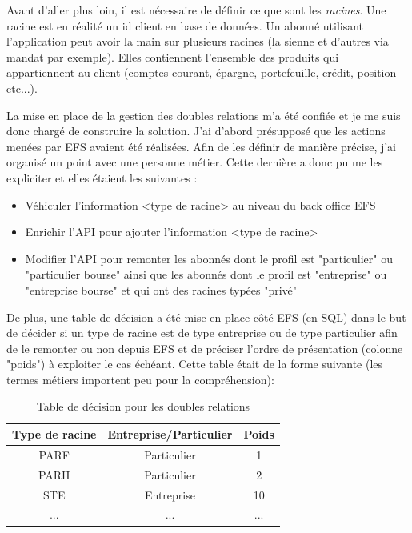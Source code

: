 	Avant d'aller plus loin, il est nécessaire de définir ce que sont les \textit{racines}. Une racine est en réalité un id client en base de données. Un abonné utilisant l'application peut avoir la main sur plusieurs racines (la sienne et d'autres via mandat par exemple). Elles contiennent l'ensemble des produits qui appartiennent au client (comptes courant, épargne, portefeuille, crédit, position etc...).
	
	La mise en place de la gestion des doubles relations m'a été confiée et je me suis donc chargé de construire la solution. J'ai d'abord présupposé que les actions menées par EFS avaient été réalisées. Afin de les définir de manière précise, j'ai organisé un point avec une personne métier. Cette dernière a donc pu me les expliciter et elles étaient les suivantes :
	\begin{itemize}
		\item Véhiculer l’information <type de racine> au niveau du back office EFS
		\item Enrichir l’API pour ajouter l’information <type de racine>
		\item Modifier l’API pour remonter les abonnés dont le profil est "particulier" ou "particulier bourse" ainsi que les abonnés dont le profil est "entreprise" ou "entreprise bourse" et qui ont des racines typées "privé" \\
	\end{itemize}
	
	De plus, une table de décision a été mise en place côté EFS (en SQL) dans le but de décider si un type de racine est de type entreprise ou de type particulier afin de le remonter ou non depuis EFS et de préciser l’ordre de présentation (colonne "poids") à exploiter le cas échéant. Cette table était de la forme suivante (les termes métiers importent peu pour la compréhension): \\
	
\begin{table}[h!]
	\center
	\begin{tabular}{| c | c | c |}
     \hline
     Type de racine & Entreprise/Particulier & Poids \\ \hline
     PARF & Particulier & 1\\ \hline
     PARH & Particulier & 2\\ \hline
     STE & Entreprise & 10\\ \hline
     ... & ... & ...\\
     \hline
	\end{tabular}
	\caption{Table de décision pour les doubles relations}
	\label{tableDecisionRacine}
\end{table}
	
